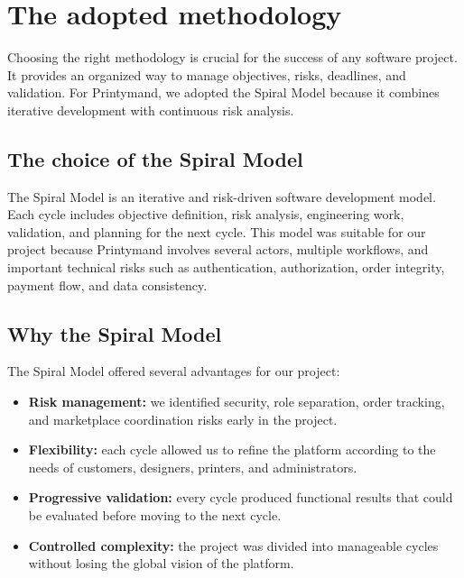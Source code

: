 
\section{The adopted methodology}
Choosing the right methodology is crucial for the success of any software project.
It provides an organized way to manage objectives, risks, deadlines, and validation.
For Printymand, we adopted the Spiral Model because it combines iterative development with continuous risk analysis.

\subsection{The choice of the Spiral Model}
The Spiral Model is an iterative and risk-driven software development model.
Each cycle includes objective definition, risk analysis, engineering work, validation, and planning for the next cycle.
This model was suitable for our project because Printymand involves several actors, multiple workflows, and important technical risks such as authentication, authorization, order integrity, payment flow, and data consistency.

\subsection{Why the Spiral Model}
The Spiral Model offered several advantages for our project:

\begin{itemize}
    \item \textbf{Risk management:} we identified security, role separation, order tracking, and marketplace coordination risks early in the project.
    \item \textbf{Flexibility:} each cycle allowed us to refine the platform according to the needs of customers, designers, printers, and administrators.
    \item \textbf{Progressive validation:} every cycle produced functional results that could be evaluated before moving to the next cycle.
    \item \textbf{Controlled complexity:} the project was divided into manageable cycles without losing the global vision of the platform.
\end{itemize}


